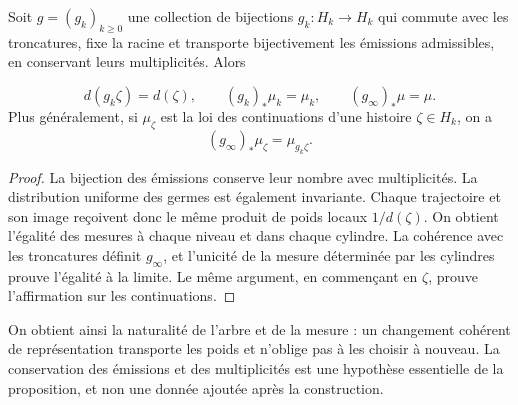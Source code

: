 \begin{proposition}
\label{prop:ch-naturalidad-medida}
Soit \(g=(g_k)_{k\geq0}\) une collection de bijections \(g_k:H_k\to H_k\)
qui commute avec les troncatures, fixe la racine et transporte bijectivement
les émissions admissibles, en conservant leurs multiplicités. Alors

\[
 d(g_k\zeta)=d(\zeta),\qquad
 (g_k)_*\mu_k=\mu_k,\qquad (g_\infty)_*\mu=\mu.
\]
Plus généralement, si \(\mu_\zeta\) est la loi des continuations d'une
histoire \(\zeta\in H_k\), on a
\[
 (g_\infty)_*\mu_\zeta=\mu_{g_k\zeta}.
\]
\end{proposition}

\begin{proof}
La bijection des émissions conserve leur nombre avec multiplicités. La
distribution uniforme des germes est également invariante. Chaque trajectoire
et son image reçoivent donc le même produit de poids locaux
\(1/d(\zeta)\). On obtient l'égalité des mesures à chaque niveau et dans
chaque cylindre. La cohérence avec les troncatures définit \(g_\infty\),
et l'unicité de la mesure déterminée par les cylindres prouve l'égalité
à la limite. Le même argument, en commençant en \(\zeta\), prouve
l'affirmation sur les continuations.
\end{proof}

On obtient ainsi la naturalité de l'arbre et de la mesure : un changement cohérent
de représentation transporte les poids et n'oblige pas à les choisir à nouveau.
La conservation des émissions et des multiplicités est une hypothèse essentielle de
la proposition, et non une donnée ajoutée après la construction.

